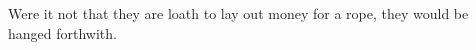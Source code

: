 \documentclass[MAIN]{subfiles}
\begin{document}
Were it not that they are loath to lay out money for a rope, they would be hanged forthwith.
\end{document}
